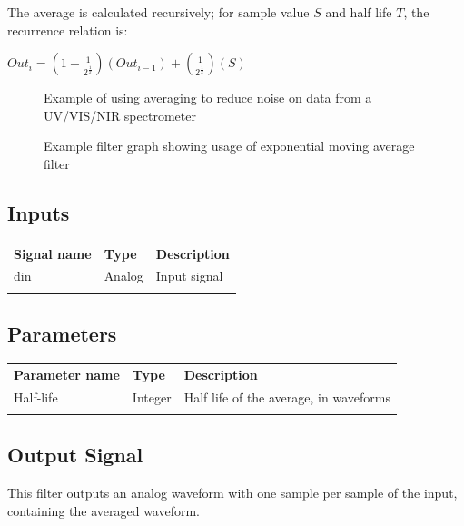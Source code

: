 The average is calculated recursively; for sample value $S$ and half life $T$, the recurrence relation is:

\begin{math}
Out_i =
	\left(1-\frac{1}{\displaystyle{2^\frac{1}{x}}}\right)\left(Out_{i-1}\right) +
	\left(\frac{1}{\displaystyle{2^\frac{1}{x}}}\right)\left(S\right)
\end{math}

\begin{figure}[h]
\centering
{}
\caption{Example of using averaging to reduce noise on data from a UV/VIS/NIR spectrometer}
\label{filter_ema}
\end{figure}

\begin{figure}[h]
\centering
{}
\caption{Example filter graph showing usage of exponential moving average filter}
\label{filter_ema}
\end{figure}
\FloatBarrier

\subsection{Inputs}

\begin{tabularx}{16cm}{llX}
\thickhline
\textbf{Signal name} & \textbf{Type} & \textbf{Description} \\
\thickhline
din & Analog & Input signal\\
\thickhline
\end{tabularx}

\subsection{Parameters}

\begin{tabularx}{16cm}{llX}
\thickhline
\textbf{Parameter name} & \textbf{Type} & \textbf{Description} \\
\thickhline
Half-life & Integer & Half life of the average, in waveforms\\
\thickhline
\end{tabularx}

\subsection{Output Signal}

This filter outputs an analog waveform with one sample per sample of the input, containing the averaged waveform.

